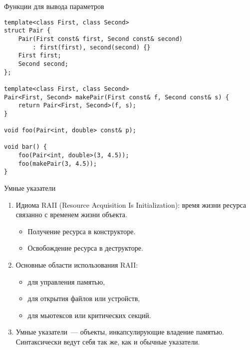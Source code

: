 \documentclass{beamer}
\begin{document}
\begin{frame}[fragile]{Функции для вывода параметров}
\small
    \begin{lstlisting}
template<class First, class Second>
struct Pair {
    Pair(First const& first, Second const& second)
        : first(first), second(second) {}
    First first;
    Second second;
};

template<class First, class Second>
Pair<First, Second> makePair(First const& f, Second const& s) {
    return Pair<First, Second>(f, s);
}

void foo(Pair<int, double> const& p);

void bar() {   
    foo(Pair<int, double>(3, 4.5));
    foo(makePair(3, 4.5));
}
    \end{lstlisting}
\end{frame}

\begin{frame}[fragile]{Умные указатели}
    \begin{enumerate}
        \item Идиома RAII (Resource Acquisition Is Initialization):
            время жизни ресурса связанно с временем жизни объекта.
            \begin{itemize}
                \item Получение ресурса в конструкторе.
                \item Освобождение ресурса в деструкторе.
            \end{itemize}

        \item Основные области использования RAII:
            \begin{itemize}
                \item для управления памятью,
                \item для открытия файлов или устройств,
                \item для мьютексов или критических секций.
            \end{itemize}

        \item Умные указатели~--- объекты, инкапсулирующие владение памятью.
            Синтаксически ведут себя так же, как и обычные указатели.
    \end{enumerate}
\end{frame}
\end{document}
